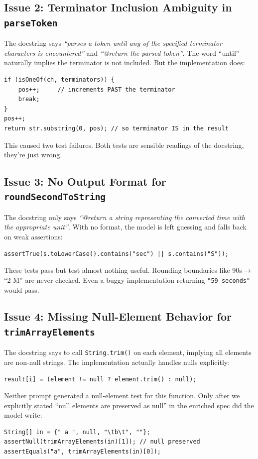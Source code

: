\documentclass[acmsmall,nonacm]{acmart}
\begin{document}
\subsection{Issue 2: Terminator Inclusion Ambiguity in \texttt{parseToken}}

The docstring says \textit{``parses a token until any of the specified terminator characters
is encountered''} and \textit{``@return the parsed token''}. The word ``until'' naturally
implies the terminator is not included. But the implementation does:
\begin{lstlisting}[style=java, numbers=none]
if (isOneOf(ch, terminators)) {
    pos++;     // increments PAST the terminator
    break;
}
pos++;
return str.substring(0, pos); // so terminator IS in the result
\end{lstlisting}
This caused two test failures. Both tests are sensible readings of the docstring, they're
just wrong.

\subsection{Issue 3: No Output Format for \texttt{roundSecondToString}}

The docstring only says \textit{``@return a string representing the converted time with the
appropriate unit''}. With no format, the model is left guessing and falls back on weak assertions:
\begin{lstlisting}[style=java, numbers=none]
assertTrue(s.toLowerCase().contains("sec") || s.contains("S"));
\end{lstlisting}
These tests pass but test almost nothing useful. Rounding boundaries like 90s$\to$``2 M''
are never checked. Even a buggy implementation returning \texttt{"59 seconds"} would pass.

\subsection{Issue 4: Missing Null-Element Behavior for \texttt{trimArrayElements}}

The docstring says to call \texttt{String.trim()} on each element, implying all elements
are non-null strings. The implementation actually handles nulls explicitly:
\begin{lstlisting}[style=java, numbers=none]
result[i] = (element != null ? element.trim() : null);
\end{lstlisting}
Neither prompt generated a null-element test for this function. Only after we
explicitly stated ``null elements are preserved as null'' in the enriched spec did the
model write:
\begin{lstlisting}[style=java, numbers=none]
String[] in = {" a ", null, "\tb\t", ""};
assertNull(trimArrayElements(in)[1]); // null preserved
assertEquals("a", trimArrayElements(in)[0]);
\end{lstlisting}
\end{document}
